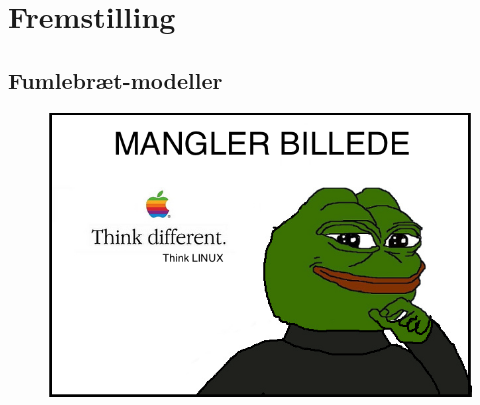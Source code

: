 \section{Fremstilling}

\subsection{Fumlebræt-modeller}
	\begin{figure}[H]
		\centering
	    \includegraphics[width=13cm]{figures/stock.jpg}
		\caption{}
		\label{fig:}
	\end{figure}

